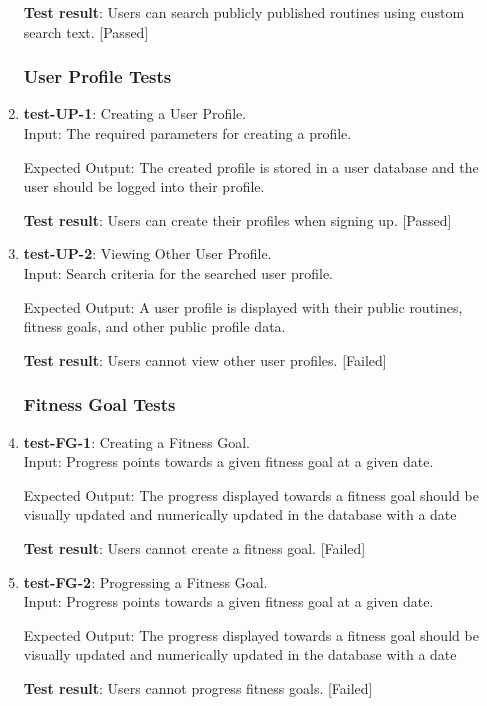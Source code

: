 \documentclass[12pt, titlepage]{article}
\begin{document}
\begin{enumerate}
    \textbf{Test result}: Users can search publicly published routines using custom search text. [Passed]
   
\subsubsection{User Profile Tests}
    \item{\textbf{test-UP-1}}: Creating a User Profile.\\
    Input: The required parameters for creating a profile.
	
    Expected Output: The created profile is stored in a user database and the user should be logged into their profile.
    
    \textbf{Test result}: Users can create their profiles when signing up. [Passed]
   
    \item{\textbf{test-UP-2}}: Viewing Other User Profile.\\
    Input: Search criteria for the searched user profile.
	
    Expected Output: A user profile is displayed with their public routines, fitness goals, and other public profile data.
    
    \textbf{Test result}: Users cannot view other user profiles. [Failed]
   
\subsubsection{Fitness Goal Tests}
    \item{\textbf{test-FG-1}}: Creating a Fitness Goal.\\
    Input: Progress points towards a given fitness goal at a given date.
	
    Expected Output: The progress displayed towards a fitness goal should be visually updated and numerically updated in the database with a date
    
    \textbf{Test result}: Users cannot create a fitness goal. [Failed]
   
    \item{\textbf{test-FG-2}}: Progressing a Fitness Goal.\\
    Input: Progress points towards a given fitness goal at a given date.
	
    Expected Output: The progress displayed towards a fitness goal should be visually updated and numerically updated in the database with a date
    
    \textbf{Test result}: Users cannot progress fitness goals. [Failed]
 
\end{enumerate}
\end{document}
